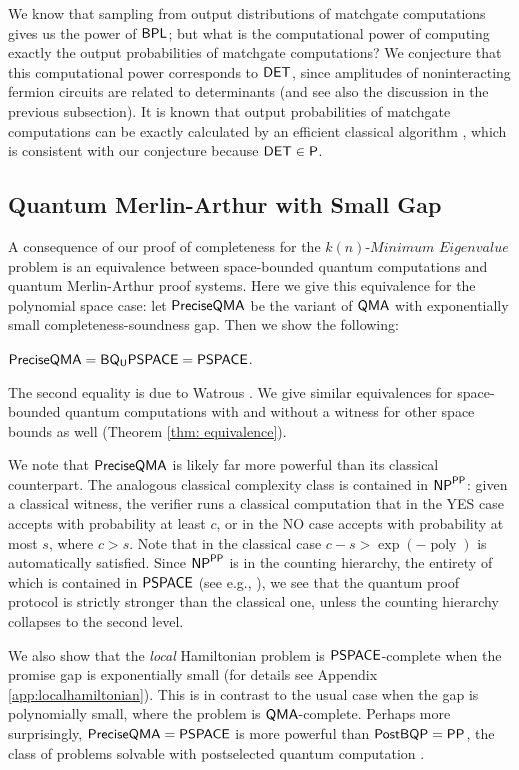 \documentclass[a4paper,UKenglish]{lipics-v2016}
\newcommand\DET{{\sf{DET}}}
\newcommand\QMA{{\sf{QMA}}}
\newcommand\PSPACE{{\sf{PSPACE}}}
\newcommand\BQPSPACE{{\sf{BQ_{U}PSPACE}}}
\newcommand\PP{\sf{PP}}
\newcommand\NP{{\sf{NP}}}
\newcommand\PostBQP{{\sf{PostBQP}}}
\newcommand\BPL{{\sf{BPL}}}
\newcommand\preciseQMA{{\sf{PreciseQMA}}}
\newcommand\spechamiltonian[1]{\ensuremath{#1}\textit{-Minimum Eigenvalue}}
\newcommand{\classfont}{\sf}
\DeclareMathOperator{\poly}{poly}
\begin{document}
We know that sampling from output distributions of matchgate computations gives us the power of $\BPL$; but what is the computational power of computing exactly the output probabilities of matchgate computations? We conjecture that this computational power corresponds to $\DET$, since amplitudes of noninteracting fermion circuits are related to determinants (and see also the discussion in the previous subsection). It is known that output probabilities of matchgate computations can be exactly calculated by an efficient classical algorithm \cite{JozMiy08RSPA}, which is consistent with our conjecture because $\DET \in \classfont{P}$.

\subsection{Quantum Merlin-Arthur with Small Gap}
A consequence of our proof of completeness for the $\spechamiltonian{k(n)}$ problem is an equivalence between space-bounded quantum computations and quantum Merlin-Arthur proof systems. Here we give this equivalence for the polynomial space case: let $\preciseQMA$ be the variant of $\QMA$ with exponentially small completeness-soundness gap. Then we show the following:
\begin{corollary} \label{cor: preciseqma}
$\preciseQMA = \BQPSPACE =  \PSPACE$.
\end{corollary}
The second equality is due to Watrous \cite{Watrous99,Watrous03}. We give similar equivalences for space-bounded quantum computations with and without a witness for other space bounds as well (Theorem \ref{thm: equivalence}).

We note that $\preciseQMA$ is likely far more powerful than its classical counterpart. The analogous classical complexity class is contained in $\NP^{\PP}$: given a classical witness, the verifier runs a classical computation that in the YES case accepts with probability at least $c$, or in the NO case accepts with probability at most $s$, where $c>s$. Note that in the classical case $c - s > \exp(-\poly)$ is automatically satisfied. Since $\NP^{\PP}$ is in the counting hierarchy, the entirety of which is contained in $\PSPACE$ (see e.g., \cite{allenderwagner}), we see that the quantum proof protocol is strictly stronger than the classical one, unless the counting hierarchy collapses to the second level.

We also show that the \emph{local} Hamiltonian problem is $\PSPACE$-complete when the promise gap is exponentially small (for details see Appendix \ref{app:localhamiltonian}). This is in contrast to the usual case when the gap is polynomially small, where the problem is $\QMA$-complete. Perhaps more surprisingly, $\preciseQMA = \PSPACE$ is more powerful than $\PostBQP=\PP$, the class of problems solvable with postselected quantum computation \cite{aaronson05}.
\end{document}
